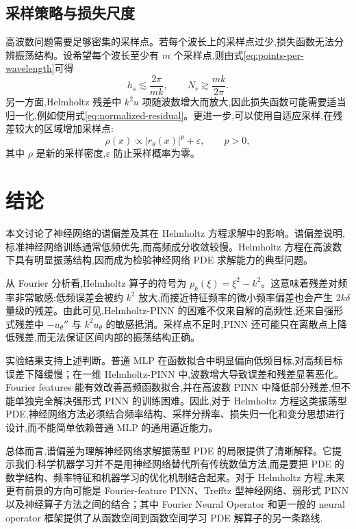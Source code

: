 \documentclass[12pt,hyperref,a4paper,UTF8,twoside]{ctexart}
\begin{document}
\subsection{采样策略与损失尺度}

高波数问题需要足够密集的采样点。若每个波长上的采样点过少,损失函数无法分辨振荡结构。设希望每个波长至少有 $m$ 个采样点,则由式\eqref{eq:points-per-wavelength}可得
\begin{equation}\label{eq:sampling-condition}
    h_s\lesssim \frac{2\pi}{mk},
    \qquad
    N_r\gtrsim \frac{mk}{2\pi}.
\end{equation}
另一方面,Helmholtz 残差中 $k^2u$ 项随波数增大而放大,因此损失函数可能需要适当归一化,例如使用式\eqref{eq:normalized-residual}。更进一步,可以使用自适应采样,在残差较大的区域增加采样点:
\begin{equation}\label{eq:adaptive-sampling}
    \rho(x)\propto |r_\theta(x)|^p+\varepsilon,
    \qquad p>0,
\end{equation}
其中 $\rho$ 是新的采样密度,$\varepsilon$ 防止采样概率为零。

\section{结论}

本文讨论了神经网络的谱偏差及其在 Helmholtz 方程求解中的影响。谱偏差说明,标准神经网络训练通常低频优先,而高频成分收敛较慢。Helmholtz 方程在高波数下具有明显振荡结构,因而成为检验神经网络 PDE 求解能力的典型问题。

从 Fourier 分析看,Helmholtz 算子的符号为 $p_k(\xi)=\xi^2-k^2$。这意味着残差对频率非常敏感:低频误差会被约 $k^2$ 放大,而接近特征频率的微小频率偏差也会产生 $2k\delta$ 量级的残差。由此可见,Helmholtz-PINN 的困难不仅来自解的高频性,还来自强形式残差中 $-u_\theta''$ 与 $k^2u_\theta$ 的敏感抵消。采样点不足时,PINN 还可能只在离散点上降低残差,而无法保证区间内部的振荡结构正确。

实验结果支持上述判断。普通 MLP 在函数拟合中明显偏向低频目标,对高频目标误差下降缓慢；在一维 Helmholtz-PINN 中,波数增大导致误差和残差显著恶化。Fourier features 能有效改善高频函数拟合,并在高波数 PINN 中降低部分残差,但不能单独完全解决强形式 PINN 的训练困难。因此,对于 Helmholtz 方程这类振荡型 PDE,神经网络方法必须结合频率结构、采样分辨率、损失归一化和变分思想进行设计,而不能简单依赖普通 MLP 的通用逼近能力。

总体而言,谱偏差为理解神经网络求解振荡型 PDE 的局限提供了清晰解释。它提示我们:科学机器学习并不是用神经网络替代所有传统数值方法,而是要把 PDE 的数学结构、频率特征和机器学习的优化机制结合起来。对于 Helmholtz 方程,未来更有前景的方向可能是 Fourier-feature PINN、Trefftz 型神经网络、弱形式 PINN 以及神经算子方法之间的结合；其中 Fourier Neural Operator 和更一般的 neural operator 框架提供了从函数空间到函数空间学习 PDE 解算子的另一条路线\cite{li2021fourier,kovachki2023neural}.



\end{document}
